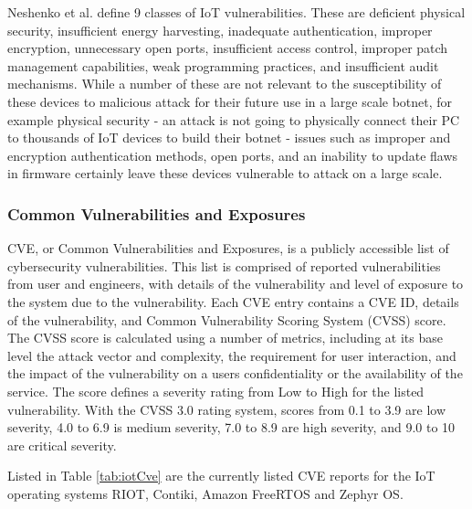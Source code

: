 Neshenko et al.\cite{neshenko_2019} define 9 classes of IoT vulnerabilities. These are
deficient physical security, insufficient energy harvesting, inadequate
authentication, improper encryption, unnecessary open ports, insufficient access
control, improper patch management capabilities, weak programming practices, and
insufficient audit mechanisms. While a number of these are not relevant to the
susceptibility of these devices to malicious attack for their future use in a
large scale botnet, for example physical security - an attack is not going to
physically connect their PC to thousands of IoT devices to build their botnet -
issues such as improper and encryption authentication methods, open ports, and
an inability to update flaws in firmware certainly leave these devices
vulnerable to attack on a large scale.

\subsubsection{Common Vulnerabilities and Exposures}

CVE, or Common Vulnerabilities and Exposures, is a publicly accessible list of
cybersecurity vulnerabilities\cite{cveHome}. This list is comprised of reported
vulnerabilities from user and engineers, with details of the vulnerability and
level of exposure to the system due to the vulnerability. Each CVE entry
contains a CVE ID, details of the vulnerability, and Common Vulnerability
Scoring System (CVSS) score. The CVSS score is calculated using a number of
metrics, including at its base level the attack vector and complexity, the
requirement for user interaction, and the impact of the vulnerability on a users
confidentiality or the availability of the service\cite{nvdCalculator}. The
score defines a severity rating from Low to High for the listed vulnerability.
With the CVSS 3.0 rating system, scores from 0.1 to 3.9 are low severity, 4.0 to
6.9 is medium severity, 7.0 to 8.9 are high severity, and 9.0 to 10 are critical
severity.

Listed in Table \ref{tab:iotCve} are the currently listed CVE reports for the IoT
operating systems RIOT, Contiki, Amazon FreeRTOS and Zephyr OS.

